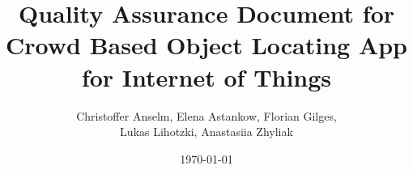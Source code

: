 \title{Quality Assurance Document for Crowd Based Object Locating App for Internet of Things}
\author{Christoffer Anselm, Elena Astankow, Florian Gilges,\\
	Lukas Lihotzki, Anastasiia Zhyliak}
\date{\today}

\titlehead{\centering\texttt{[image: img/groupLogo/BLELoc-Logo]}\\[\baselineskip]
	{\Huge BLEloc}}

